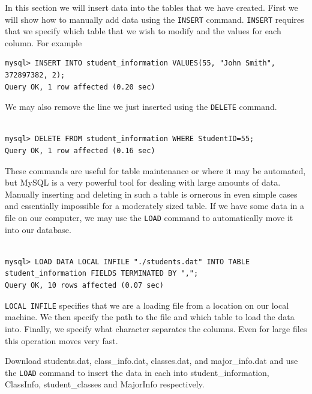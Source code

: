 In this section we will insert data into the tables that we have created.  First we will show how to manually add data using the {\tt INSERT} command.  {\tt INSERT} requires that we specify which table that we wish to modify and the values for each column.  For example

\begin{lstlisting}
mysql> INSERT INTO student_information VALUES(55, "John Smith", 372897382, 2);
Query OK, 1 row affected (0.20 sec)
\end{lstlisting}

We may also remove the line we just inserted using the {\tt DELETE} command.

\begin{lstlisting}

mysql> DELETE FROM student_information WHERE StudentID=55;
Query OK, 1 row affected (0.16 sec)

\end{lstlisting}

These commands are useful for table maintenance or where it may be automated, but MySQL is a very powerful tool for dealing with large amounts of data.  Manually inserting and deleting in such a table is ornerous in even simple cases and essentially impossible for a moderately sized table.  If we have some data in a file on our computer, we may use the {\tt LOAD} command to automatically move it into our database.

\begin{lstlisting}

mysql> LOAD DATA LOCAL INFILE "./students.dat" INTO TABLE student_information FIELDS TERMINATED BY ",";
Query OK, 10 rows affected (0.07 sec)

\end{lstlisting}

{\tt LOCAL INFILE} specifies that we are a loading file from a location on our local machine.  We then specify the path to the file and which table to load the data into.  Finally, we specify what character separates the columns.  Even for large files this operation moves very fast.

\begin{problem}

Download students.dat, class\_info.dat, classes.dat, and major\_info.dat and use the {\tt LOAD} command to insert the data in each into student\_information, ClassInfo, student\_classes and MajorInfo respectively.

\end{problem}

